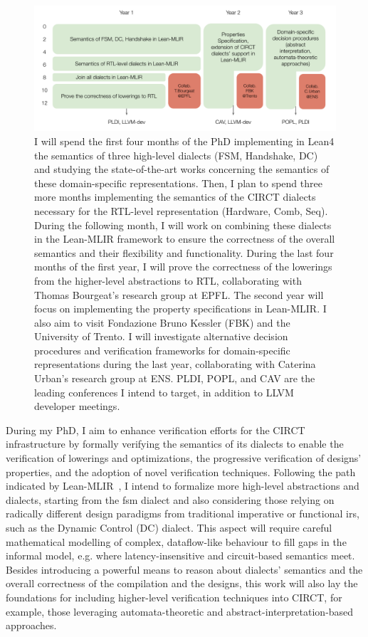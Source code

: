\documentclass[sigconf,authorversion,nonacm, 11pt]{acmart}
\begin{document}
\begin{figure}[ht]
    \includegraphics[scale=0.8]{logistics.pdf}
    \caption{
        I will spend the first four months of the PhD implementing in Lean4 the semantics of three high-level dialects (FSM, Handshake, DC) and studying the state-of-the-art works concerning the semantics of these domain-specific representations.
        Then, I plan to spend three more months implementing the semantics of the CIRCT dialects necessary for the RTL-level representation (Hardware, Comb, Seq). 
        During the following month, I will work on combining these dialects in the Lean-MLIR framework to ensure the correctness of the overall semantics and their flexibility and functionality. 
        During the last four months of the first year, I will prove the correctness of the lowerings from the higher-level abstractions to RTL, collaborating with Thomas Bourgeat's research group at EPFL. 
        The second year will focus on implementing the property specifications in Lean-MLIR. I also aim to visit Fondazione Bruno Kessler (FBK) and the University of Trento. 
        I will investigate alternative decision procedures and verification frameworks for domain-specific representations during the last year, collaborating with Caterina Urban's research group at ENS. PLDI, POPL, and CAV are the leading conferences I intend to target, in addition to LLVM developer meetings. 
    }
    \label{fig:logistics}
\end{figure}

During my PhD, I aim to enhance verification efforts for the CIRCT infrastructure by formally verifying the semantics of its dialects to enable the verification of lowerings and optimizations, the progressive verification of designs' properties, and the adoption of novel verification techniques. 
Following the path indicated by Lean-MLIR~\cite{bhat2024verifying}, I intend to formalize more high-level abstractions and dialects, starting from the \ac{fsm} dialect and also considering those relying on radically different design paradigms from traditional imperative or functional \acp{ir}, such as the Dynamic Control (DC) dialect. 
This aspect will require careful mathematical modelling of complex, dataflow-like behaviour to fill gaps in the informal model, e.g. where latency-insensitive and circuit-based semantics meet. 
Besides introducing a powerful means to reason about dialects' semantics and the overall correctness of the compilation and the designs, this work will also lay the foundations for including higher-level verification techniques into CIRCT, for example, those leveraging automata-theoretic and abstract-interpretation-based approaches. 
\end{document}
